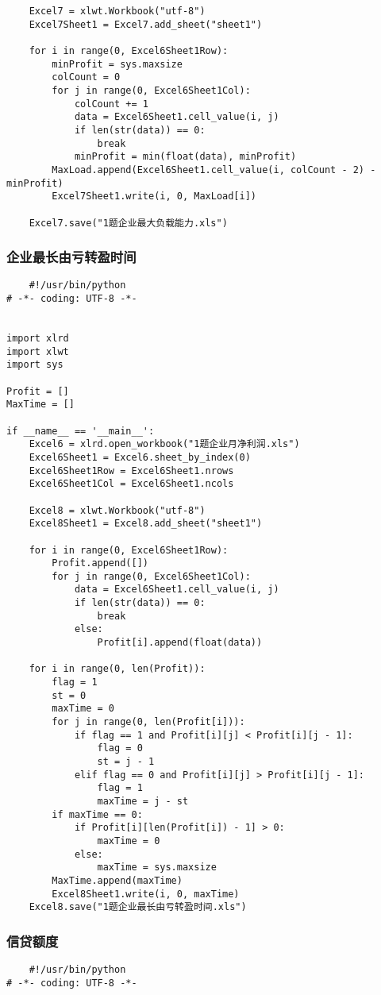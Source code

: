 \documentclass[dvipsnames,withoutpreface,bwprint]{cumcmthesis}
\begin{document}
\begin{appendices}
\begin{lstlisting}
    Excel7 = xlwt.Workbook("utf-8")
    Excel7Sheet1 = Excel7.add_sheet("sheet1")

    for i in range(0, Excel6Sheet1Row):
        minProfit = sys.maxsize
        colCount = 0
        for j in range(0, Excel6Sheet1Col):
            colCount += 1
            data = Excel6Sheet1.cell_value(i, j)
            if len(str(data)) == 0:
                break
            minProfit = min(float(data), minProfit)
        MaxLoad.append(Excel6Sheet1.cell_value(i, colCount - 2) - minProfit)
        Excel7Sheet1.write(i, 0, MaxLoad[i])

    Excel7.save("1题企业最大负载能力.xls")
\end{lstlisting}
\subsubsection{企业最长由亏转盈时间}
\begin{lstlisting}
    #!/usr/bin/python
# -*- coding: UTF-8 -*-


import xlrd
import xlwt
import sys

Profit = []
MaxTime = []

if __name__ == '__main__':
    Excel6 = xlrd.open_workbook("1题企业月净利润.xls")
    Excel6Sheet1 = Excel6.sheet_by_index(0)
    Excel6Sheet1Row = Excel6Sheet1.nrows
    Excel6Sheet1Col = Excel6Sheet1.ncols

    Excel8 = xlwt.Workbook("utf-8")
    Excel8Sheet1 = Excel8.add_sheet("sheet1")

    for i in range(0, Excel6Sheet1Row):
        Profit.append([])
        for j in range(0, Excel6Sheet1Col):
            data = Excel6Sheet1.cell_value(i, j)
            if len(str(data)) == 0:
                break
            else:
                Profit[i].append(float(data))

    for i in range(0, len(Profit)):
        flag = 1
        st = 0
        maxTime = 0
        for j in range(0, len(Profit[i])):
            if flag == 1 and Profit[i][j] < Profit[i][j - 1]:
                flag = 0
                st = j - 1
            elif flag == 0 and Profit[i][j] > Profit[i][j - 1]:
                flag = 1
                maxTime = j - st
        if maxTime == 0:
            if Profit[i][len(Profit[i]) - 1] > 0:
                maxTime = 0
            else:
                maxTime = sys.maxsize
        MaxTime.append(maxTime)
        Excel8Sheet1.write(i, 0, maxTime)
    Excel8.save("1题企业最长由亏转盈时间.xls")
\end{lstlisting}
\subsubsection{信贷额度}
\begin{lstlisting}
    #!/usr/bin/python
# -*- coding: UTF-8 -*-


\end{lstlisting}
\end{appendices}
\end{document}
